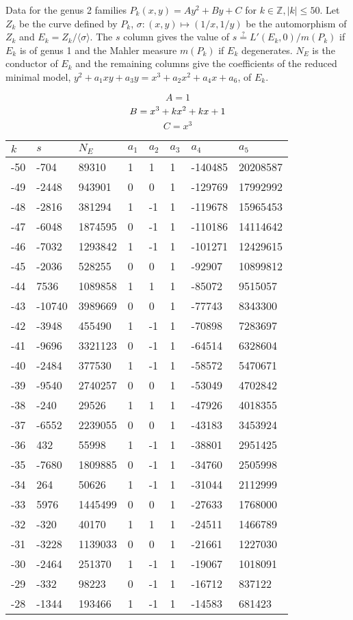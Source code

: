 \documentclass{amsart}
\begin{document}
Data for the genus 2 families $P_k(x,y)=Ay^2+By+C$ for $k\in \mathbb{Z}, |k|\leqslant 50$. Let $Z_k$ be the curve defined by $P_k$, $\sigma:(x,y)\mapsto(1/x,1/y)$ be the automorphism of $Z_k$ and $E_k=Z_k/\langle\sigma\rangle$. The $s$ column gives the value of $s\stackrel{?}{=}L'(E_k,0)/m(P_k)$ if $E_k$ is of genus 1 and the Mahler measure $m(P_k)$ if $E_k$ degenerates. $N_E$ is the conductor of $E_k$ and the remaining columns give the coefficients of the reduced minimal model, $y^2+a_1xy+a_3y=x^3+a_2x^2+a_4x+a_6$, of $E_k$.

$$A=1$$
$$B=x^3
 + k\*x^2
 + k\*x
 + 1$$
$$C=x^3$$
\begin{longtable}{|l|l|l|lllll|}
\hline
$k$ & $s$ & $N_E$ & $a_1$ & $a_2$ & $a_3$ & $a_4$ & $a_5$\\
\hline
-50&-704&89310&1&1&1&-140485&20208587\\
-49&-2448&943901&0&0&1&-129769&17992992\\
-48&-2816&381294&1&-1&1&-119678&15965453\\
-47&-6048&1874595&0&-1&1&-110186&14114642\\
-46&-7032&1293842&1&-1&1&-101271&12429615\\
-45&-2036&528255&0&0&1&-92907&10899812\\
-44&7536&1089858&1&1&1&-85072&9515057\\
-43&-10740&3989669&0&0&1&-77743&8343300\\
-42&-3948&455490&1&-1&1&-70898&7283697\\
-41&-9696&3321123&0&-1&1&-64514&6328604\\
-40&-2484&377530&1&-1&1&-58572&5470671\\
-39&-9540&2740257&0&0&1&-53049&4702842\\
-38&-240&29526&1&1&1&-47926&4018355\\
-37&-6552&2239055&0&0&1&-43183&3453924\\
-36&432&55998&1&-1&1&-38801&2951425\\
-35&-7680&1809885&0&-1&1&-34760&2505998\\
-34&264&50626&1&-1&1&-31044&2112999\\
-33&5976&1445499&0&0&1&-27633&1768000\\
-32&-320&40170&1&1&1&-24511&1466789\\
-31&-3228&1139033&0&0&1&-21661&1227030\\
-30&-2464&251370&1&-1&1&-19067&1018091\\
-29&-332&98223&0&-1&1&-16712&837122\\
-28&-1344&193466&1&-1&1&-14583&681423\\

\end{longtable}
\end{document}
